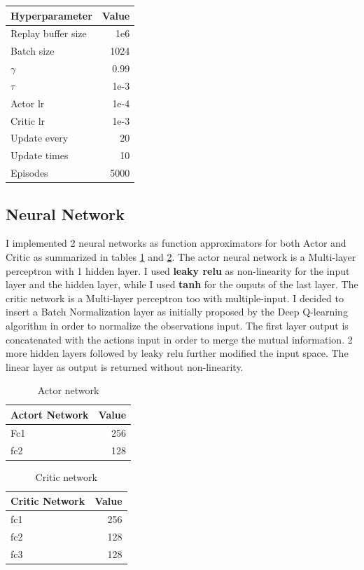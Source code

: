 \documentclass[11pt]{article}
\begin{document}
\begin{center}
\begin{tabular}{lr}
Hyperparameter & Value\\
\hline
Replay buffer size & 1e6\\
Batch size & 1024\\
\(\gamma\) & 0.99\\
\(\tau\) & 1e-3\\
Actor lr & 1e-4\\
Critic lr & 1e-3\\
Update every & 20\\
Update times & 10\\
Episodes & 5000\\
\hline
\end{tabular}
\end{center}

\subsection{Neural Network}
\label{sec:org9460d00}
I implemented 2 neural networks as function approximators for both Actor and
Critic as summarized in tables \ref{tab:org266b26d} and \ref{tab:orgeb9921d}. The actor neural network is a Multi-layer perceptron with 1 hidden
layer. I used \textbf{leaky relu} as non-linearity for the input layer and the hidden
layer, while I used \textbf{tanh} for the ouputs of the last layer.  The critic network
is a Multi-layer perceptron too with multiple-input. I decided to insert a Batch
Normalization layer as initially proposed by the Deep Q-learning algorithm in
order to normalize the observations input. The first layer output is
concatenated with the actions input in order to merge the mutual information. 2
more hidden layers followed by leaky relu further modified the input space. The
linear layer as output is returned without non-linearity.




\begin{table}[htbp]
\caption{\label{tab:org266b26d}Actor network}
\centering
\begin{tabular}{lr}
\hline
Actort Network & Value\\
\hline
Fc1 & 256\\
fc2 & 128\\
\hline
\end{tabular}
\end{table}


\begin{table}[htbp]
\caption{\label{tab:orgeb9921d}Critic network}
\centering
\begin{tabular}{lr}
\hline
Critic Network & Value\\
\hline
fc1 & 256\\
fc2 & 128\\
fc3 & 128\\
\hline
\end{tabular}
\end{table}
\end{document}
